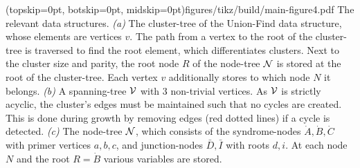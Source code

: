 


\Figure[tb](topskip=0pt, botskip=0pt, midskip=0pt){figures/tikz/build/main-figure4.pdf}{
    The relevant data structures. \emph{(a)} The cluster-tree of the Union-Find data structure, whose elements are vertices $v$. The path from a vertex to the root of the cluster-tree is traversed to find the root element, which differentiates clusters. Next to the cluster size and parity, the root node $R$ of the node-tree $\mathcal{N}$ is stored at the root of the cluster-tree. Each vertex $v$ additionally stores to which node $N$ it belongs. \emph{(b)} A spanning-tree $\mathcal{V}$ with 3 non-trivial vertices. As $\mathcal{V}$ is strictly acyclic, the cluster's edges must be maintained such that no cycles are created. This is done during growth by removing edges (red dotted lines) if a cycle is detected. \emph{(c)} The node-tree $\mathcal{N}$, which consists of the syndrome-nodes $\dot{A}, \dot{B}, \dot{C}$ with primer vertices $a, b, c$, and junction-nodes $\bar{D}, \bar{I}$ with roots $d,i$. At each node $N$ and the root $R=\dot{B}$ various variables are stored.\label{fig:nodetypes}}

